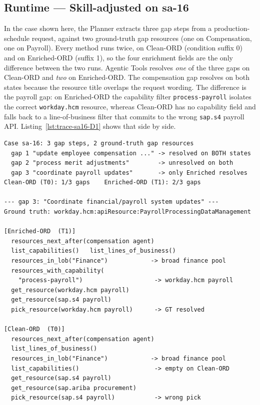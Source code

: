 \subsection{Runtime --- Skill-adjusted on sa-16}
\label{appendix:trace-rt-sa-16}

In the case shown here, the Planner extracts three gap steps from a production-schedule request, against two ground-truth gap resources (one on Compensation, one on Payroll). Every method runs twice, on Clean-ORD (condition suffix 0) and on Enriched-ORD (suffix 1), so the four enrichment fields are the only difference between the two runs. Agentic Tools resolves \emph{one} of the three gaps on Clean-ORD and \emph{two} on Enriched-ORD. The compensation gap resolves on both states because the resource title overlaps the request wording. The difference is the payroll gap: on Enriched-ORD the capability filter \texttt{process-payroll} isolates the correct \texttt{workday.hcm} resource, whereas Clean-ORD has no capability field and falls back to a line-of-business filter that commits to the wrong \texttt{sap.s4} payroll API. Listing~\ref{lst:trace-sa16-D1} shows that side by side.

\begin{lstlisting}[float=!t, floatplacement=!t, basicstyle=\ttfamily\scriptsize, breaklines=true, frame=single, label={lst:trace-sa16-D1}, caption={Agentic Tools on the payroll gap of \texttt{sa-16} (gap 3 of 3). The \texttt{process-payroll} capability filter that Enriched-ORD provides is the decisive step; Clean-ORD has no equivalent signal and falls back to a broad line-of-business filter.}]
Case sa-16: 3 gap steps, 2 ground-truth gap resources
  gap 1 "update employee compensation ..." -> resolved on BOTH states
  gap 2 "process merit adjustments"        -> unresolved on both
  gap 3 "coordinate payroll updates"       -> only Enriched resolves
Clean-ORD (T0): 1/3 gaps    Enriched-ORD (T1): 2/3 gaps

--- gap 3: "Coordinate financial/payroll system updates" ---
Ground truth: workday.hcm:apiResource:PayrollProcessingDataManagement

[Enriched-ORD  (T1)]
  resources_next_after(compensation agent)
  list_capabilities()   list_lines_of_business()
  resources_in_lob("Finance")            -> broad finance pool
  resources_with_capability(
    "process-payroll")                    -> workday.hcm payroll
  get_resource(workday.hcm payroll)
  get_resource(sap.s4 payroll)
  pick_resource(workday.hcm payroll)      -> GT resolved

[Clean-ORD  (T0)]
  resources_next_after(compensation agent)
  list_lines_of_business()
  resources_in_lob("Finance")            -> broad finance pool
  list_capabilities()                     -> empty on Clean-ORD
  get_resource(sap.s4 payroll)
  get_resource(sap.ariba procurement)
  pick_resource(sap.s4 payroll)           -> wrong pick
\end{lstlisting}


